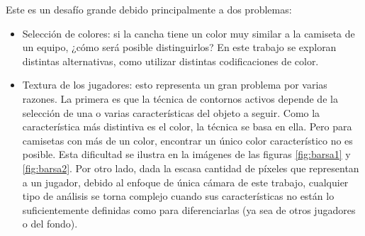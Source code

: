 Este es un desafío grande debido principalmente a dos problemas:
\begin{itemize}

\item Selección de colores: si la cancha tiene un color muy similar a la
  camiseta de un equipo, ¿cómo será posible distinguirlos? En este trabajo se
  exploran distintas alternativas, como utilizar distintas codificaciones de
  color.

\item Textura de los jugadores: esto representa un gran problema por varias
  razones. La primera es que la técnica de contornos activos depende de la
  selección de una o varias características del objeto a seguir. Como la
  característica más distintiva es el color, la técnica se basa en ella. Pero
  para camisetas con más de un color, encontrar un único color característico
  no es posible. Esta dificultad se ilustra en la imágenes de las figuras
  \ref{fig:barsa1} y \ref{fig:barsa2}. Por otro lado, dada la escasa cantidad
  de píxeles que representan a un jugador, debido al enfoque de única
  cámara de este trabajo, cualquier tipo de análisis se torna complejo cuando
  sus características no están lo suficientemente definidas como para
  diferenciarlas (ya sea de otros jugadores o del fondo).

\end{itemize}

